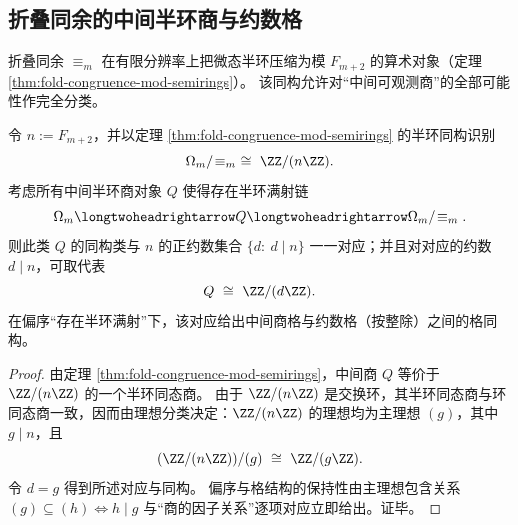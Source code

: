 \subsection{折叠同余的中间半环商与约数格}\label{subsec:fold-intermediate-semirings-divisor-lattice}
折叠同余 \(\equiv_m\) 在有限分辨率上把微态半环压缩为模 \(F_{m+2}\) 的算术对象（定理 \ref{thm:fold-congruence-mod-semirings}）。
该同构允许对“中间可观测商”的全部可能性作完全分类。

\begin{proposition}\label{prop:fold-intermediate-semirings-divisor-lattice}
令 \(n:=F_{m+2}\)，并以定理 \ref{thm:fold-congruence-mod-semirings} 的半环同构识别
\[
\Omega_m/\!\equiv_m\ \cong\ \ZZ/(n\ZZ).
\]
考虑所有中间半环商对象 \(Q\) 使得存在半环满射链
\[
\Omega_m\longtwoheadrightarrow Q\longtwoheadrightarrow \Omega_m/\!\equiv_m.
\]
则此类 \(Q\) 的同构类与 \(n\) 的正约数集合 \(\{d:\ d\mid n\}\) 一一对应；并且对对应的约数 \(d\mid n\)，可取代表
\[
Q\ \cong\ \ZZ/(d\ZZ).
\]
在偏序“存在半环满射”下，该对应给出中间商格与约数格（按整除）之间的格同构。
\end{proposition}
\begin{proof}
由定理 \ref{thm:fold-congruence-mod-semirings}，中间商 \(Q\) 等价于 \(\ZZ/(n\ZZ)\) 的一个半环同态商。
由于 \(\ZZ/(n\ZZ)\) 是交换环，其半环同态商与环同态商一致，因而由理想分类决定：\(\ZZ/(n\ZZ)\) 的理想均为主理想 \((g)\)，其中 \(g\mid n\)，且
\[
(\ZZ/(n\ZZ))/(g)\ \cong\ \ZZ/(g\ZZ).
\]
令 \(d=g\) 得到所述对应与同构。
偏序与格结构的保持性由主理想包含关系 \((g)\subseteq (h)\iff h\mid g\) 与“商的因子关系”逐项对应立即给出。证毕。
\end{proof}

\endinput
